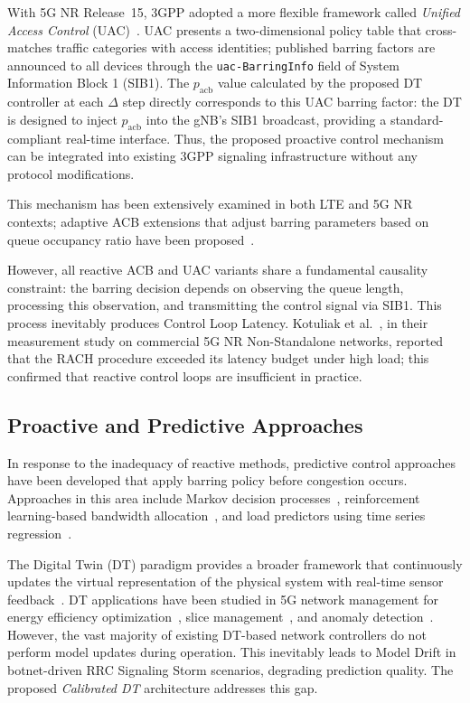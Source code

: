 \documentclass[conference]{IEEEtran}
\newcommand{\pacb}{p_{\mathrm{acb}}}
\begin{document}
With 5G NR Release~15, 3GPP adopted a more flexible framework called \emph{Unified Access Control} (UAC)~\cite{b4}. UAC presents a two-dimensional policy table that cross-matches traffic categories with access identities; published barring factors are announced to all devices through the \texttt{uac-BarringInfo} field of System Information Block 1 (SIB1). The $\pacb$ value calculated by the proposed DT controller at each $\Delta$ step directly corresponds to this UAC barring factor: the DT is designed to inject $\pacb$ into the gNB's SIB1 broadcast, providing a standard-compliant real-time interface. Thus, the proposed proactive control mechanism can be integrated into existing 3GPP signaling infrastructure without any protocol modifications.

This mechanism has been extensively examined in both LTE and 5G NR contexts; adaptive ACB extensions that adjust barring parameters based on queue occupancy ratio have been proposed~\cite{b5}.

However, all reactive ACB and UAC variants share a fundamental causality constraint: the barring decision depends on observing the queue length, processing this observation, and transmitting the control signal via SIB1. This process inevitably produces Control Loop Latency. Kotuliak et al.~\cite{b6}, in their measurement study on commercial 5G NR Non-Standalone networks, reported that the RACH procedure exceeded its latency budget under high load; this confirmed that reactive control loops are insufficient in practice.

\subsection{Proactive and Predictive Approaches}

In response to the inadequacy of reactive methods, predictive control approaches have been developed that apply barring policy before congestion occurs. Approaches in this area include Markov decision processes~\cite{b7}, reinforcement learning-based bandwidth allocation~\cite{b8}, and load predictors using time series regression~\cite{b9}.

The Digital Twin (DT) paradigm provides a broader framework that continuously updates the virtual representation of the physical system with real-time sensor feedback~\cite{b10}. DT applications have been studied in 5G network management for energy efficiency optimization~\cite{b11}, slice management~\cite{b12}, and anomaly detection~\cite{b13}. However, the vast majority of existing DT-based network controllers do not perform model updates during operation. This inevitably leads to Model Drift in botnet-driven RRC Signaling Storm scenarios, degrading prediction quality. The proposed \emph{Calibrated DT} architecture addresses this gap.
\end{document}
